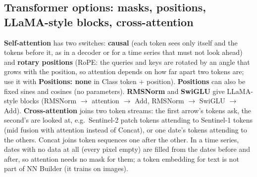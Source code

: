 \documentclass[11pt,a4paper]{article}
\newcommand{\ui}[1]{\textbf{\textsf{#1}}}
\begin{document}
\subsection{Transformer options: masks, positions, LLaMA-style blocks, cross-attention}
\label{sec:transformer-extra}
\ui{Self-attention} has two switches: \ui{causal} (each token sees only itself and the tokens before it, as in a decoder or for a time
series that must not look ahead) and \ui{rotary positions} (RoPE: the queries and keys are rotated by an angle that grows with the
position, so attention depends on how far apart two tokens are; use it with \ui{Positions: none} in Class token + position).
\ui{Positions} can also be fixed sines and cosines (no parameters). \ui{RMSNorm} and \ui{SwiGLU} give LLaMA-style blocks (RMSNorm
$\rightarrow$ attention $\rightarrow$ Add, RMSNorm $\rightarrow$ SwiGLU $\rightarrow$ Add). \ui{Cross-attention} joins two token streams:
the first arrow's tokens ask, the second's are looked at, e.g.\ Sentinel-2 patch tokens attending to Sentinel-1 tokens (mid fusion with
attention instead of Concat), or one date's tokens attending to the others. Concat joins token sequences one after the other. In a
time series, dates with no data at all (every pixel empty) are filled from the dates before and after, so attention needs no mask for
them; a token embedding for text is not part of NN Builder (it trains on images).
\end{document}
